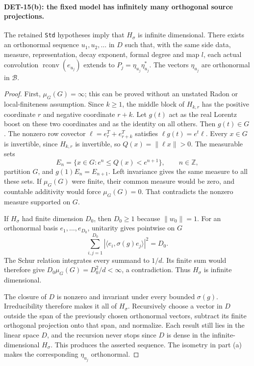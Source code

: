 \paragraph{DET-15(b): the fixed model has infinitely many orthogonal source projections.}
The retained \texttt{Std} hypotheses imply that \(H_\sigma\)
is infinite dimensional. There exists an orthonormal sequence
\(u_1,u_2,\ldots\) in \(D\) such that, with the same side data,
measure, representation, decay exponent, formal degree and map \(l\),
each actual convolution \(\operatorname{rconv}(e_{u_j})\)
extends to \(P_j=\eta_{u_j}\eta_{u_j}^*\).
The vectors \(\eta_{u_j}\) are orthonormal in \(\mathcal B\).
\begin{proof}
First, \(\mu_G(G)=\infty\); this can be proved without an
unstated Radon or local-finiteness assumption. Since \(k\ge1\),
the middle block of \(H_{k,r}\) has the positive coordinate \(r\)
and negative coordinate \(r+k\). Let \(g(t)\) act as the
real Lorentz boost on these two coordinates and as the identity
on all others. Then \(g(t)\in G\). The nonzero row covector
\(\ell=e_r^T+e_{r+k}^T\) satisfies \(\ell g(t)=e^t\ell\).
Every \(x\in G\) is invertible, since \(H_{k,r}\) is invertible,
so \(Q(x)=\|\ell x\|>0\). The measurable sets
\[
 E_n=\{x\in G:e^n\le Q(x)<e^{n+1}\},\qquad n\in\mathbb Z,
\]
partition \(G\), and \(g(1)E_n=E_{n+1}\).
Left invariance gives the same measure to all these sets.
If \(\mu_G(G)\) were finite, their common measure would be zero,
and countable additivity would force \(\mu_G(G)=0\).
That contradicts the nonzero measure supported on \(G\).

If \(H_\sigma\) had finite dimension \(D_0\), then \(D_0\ge1\)
because \(\|w_0\|=1\). For an orthonormal basis \(e_1,\ldots,e_{D_0}\),
unitarity gives pointwise on \(G\)
\[
 \sum_{i,j=1}^{D_0}
 |\langle e_i,\sigma(g)e_j\rangle|^2=D_0.
\]
The Schur relation integrates every summand to \(1/d\).
Its finite sum would therefore give
\(D_0\mu_G(G)=D_0^2/d<\infty\), a contradiction.
Thus \(H_\sigma\) is infinite dimensional.

The closure of \(D\) is nonzero and invariant under every bounded
\(\sigma(g)\). Irreducibility therefore makes it all of \(H_\sigma\).
Recursively choose a vector in \(D\) outside the span of the previously
chosen orthonormal vectors, subtract its finite orthogonal projection
onto that span, and normalize. Each result still lies in the
linear space \(D\), and the recursion never stops since \(D\)
is dense in the infinite-dimensional \(H_\sigma\).
This produces the asserted sequence. The isometry in part (a)
makes the corresponding \(\eta_{u_j}\) orthonormal.


\end{proof}
